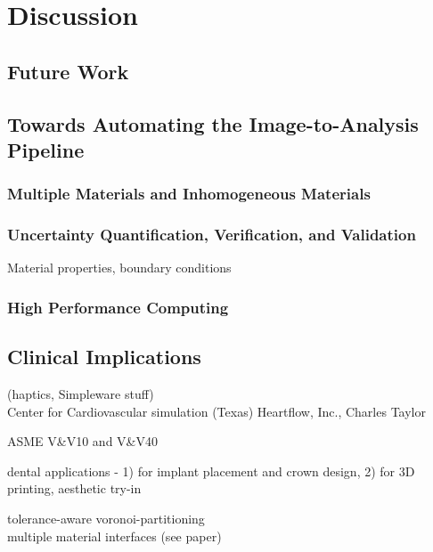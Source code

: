 \chapter{Discussion}
%

\section{Future Work}
\label{Future Work}
\section{Towards Automating the Image-to-Analysis Pipeline}
\label{Towards Automating the Image-to-Analysis Pipeline}
\subsection{Multiple Materials and Inhomogeneous Materials}
\label{Multiple Materials and Inhomogeneous Materials}
\subsection{Uncertainty Quantification, Verification, and Validation}
\label{Uncertainty Quantification, Verification, and Validation}
Material properties, boundary conditions
\subsection{High Performance Computing}
\label{High Performance Computing}
\section{Clinical Implications}
\label{Clinical Implications}
(haptics, Simpleware stuff)\\
Center for Cardiovascular simulation (Texas)
Heartflow, Inc., Charles Taylor

ASME V\&V10 and V\&V40

dental applications - 1) for implant placement and crown design, 2) for 3D printing, aesthetic try-in 

tolerance-aware voronoi-partitioning \\
multiple material interfaces (see paper) \\

